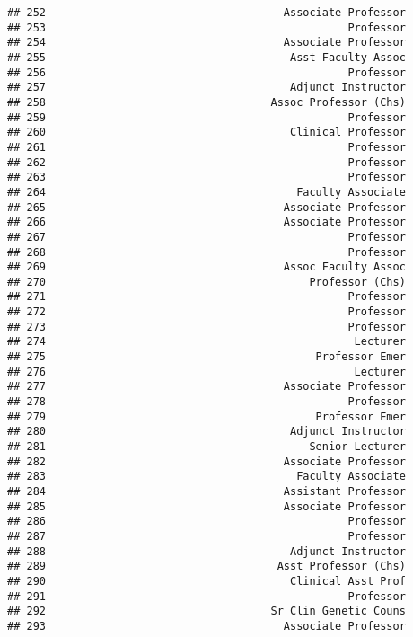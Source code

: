 \documentclass[
]{article}
\begin{document}
\begin{verbatim}
## 252                                     Associate Professor
## 253                                               Professor
## 254                                     Associate Professor
## 255                                      Asst Faculty Assoc
## 256                                               Professor
## 257                                      Adjunct Instructor
## 258                                   Assoc Professor (Chs)
## 259                                               Professor
## 260                                      Clinical Professor
## 261                                               Professor
## 262                                               Professor
## 263                                               Professor
## 264                                       Faculty Associate
## 265                                     Associate Professor
## 266                                     Associate Professor
## 267                                               Professor
## 268                                               Professor
## 269                                     Assoc Faculty Assoc
## 270                                         Professor (Chs)
## 271                                               Professor
## 272                                               Professor
## 273                                               Professor
## 274                                                Lecturer
## 275                                          Professor Emer
## 276                                                Lecturer
## 277                                     Associate Professor
## 278                                               Professor
## 279                                          Professor Emer
## 280                                      Adjunct Instructor
## 281                                         Senior Lecturer
## 282                                     Associate Professor
## 283                                       Faculty Associate
## 284                                     Assistant Professor
## 285                                     Associate Professor
## 286                                               Professor
## 287                                               Professor
## 288                                      Adjunct Instructor
## 289                                    Asst Professor (Chs)
## 290                                      Clinical Asst Prof
## 291                                               Professor
## 292                                   Sr Clin Genetic Couns
## 293                                     Associate Professor

\end{verbatim}
\end{document}
